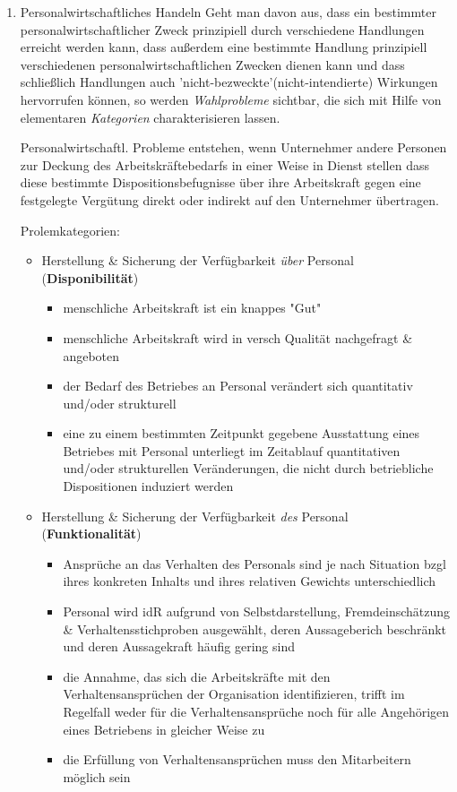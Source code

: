 \documentclass[11pt]{article}
\begin{document}
\begin{enumerate}
\item Personalwirtschaftliches Handeln
\label{sec:orga9d796b}
Geht man davon aus, dass ein bestimmter personalwirtschaftlicher Zweck prinzipiell durch verschiedene Handlungen erreicht werden kann, dass außerdem eine bestimmte Handlung prinzipiell verschiedenen personalwirtschaftlichen Zwecken dienen kann und dass schließlich Handlungen auch 'nicht-bezweckte'(nicht-intendierte) Wirkungen hervorrufen können, so werden \emph{Wahlprobleme} sichtbar, die sich mit Hilfe von elementaren \emph{Kategorien} charakterisieren lassen.

Personalwirtschaftl. Probleme entstehen, wenn Unternehmer andere Personen zur Deckung des Arbeitskräftebedarfs in einer Weise in Dienst stellen dass diese bestimmte Dispositionsbefugnisse über ihre Arbeitskraft gegen eine festgelegte Vergütung direkt oder indirekt auf den Unternehmer übertragen.

Prolemkategorien:
\begin{itemize}
\item Herstellung \& Sicherung der Verfügbarkeit \emph{über} Personal (\textbf{Disponibilität})
\begin{itemize}
\item menschliche Arbeitskraft ist ein knappes "Gut"
\item menschliche Arbeitskraft wird in versch Qualität nachgefragt \& angeboten
\item der Bedarf des Betriebes an Personal verändert sich quantitativ und/oder strukturell
\item eine zu einem bestimmten Zeitpunkt gegebene Ausstattung eines Betriebes mit Personal unterliegt im Zeitablauf quantitativen und/oder strukturellen Veränderungen, die nicht durch betriebliche Dispositionen induziert werden
\end{itemize}
\item Herstellung \& Sicherung der Verfügbarkeit \emph{des} Personal (\textbf{Funktionalität})
\begin{itemize}
\item Ansprüche an das Verhalten des Personals sind je nach Situation bzgl ihres konkreten Inhalts und ihres relativen Gewichts unterschiedlich
\item Personal wird idR aufgrund von Selbstdarstellung, Fremdeinschätzung \& Verhaltensstichproben ausgewählt, deren Aussageberich beschränkt und deren Aussagekraft häufig gering sind
\item die Annahme, das sich die Arbeitskräfte mit den Verhaltensansprüchen der Organisation identifizieren, trifft im Regelfall weder für die Verhaltensansprüche noch für alle Angehörigen eines Betriebens in gleicher Weise zu
\item die Erfüllung von Verhaltensansprüchen muss den Mitarbeitern möglich sein
\end{itemize}
\end{itemize}


\end{enumerate}
\end{document}
